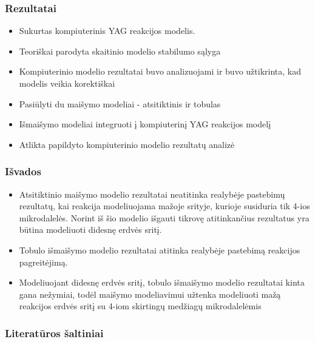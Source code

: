 \documentclass{beamer}
\begin{document}
\begin{frame}
\frametitle{Rezultatai}
\begin{itemize}
    \item Sukurtas kompiuterinis YAG reakcijos modelis. 
    \item Teoriškai parodyta skaitinio modelio stabilumo sąlyga
    \item Kompiuterinio modelio rezultatai buvo analizuojami ir buvo užtikrinta, kad modelis veikia korektiškai
    \item Pasiūlyti du maišymo modeliai - atsitiktinis ir tobulas
    \item Išmaišymo modeliai integruoti į kompiuterinį YAG reakcijos modelį
    \item Atlikta papildyto kompiuterinio modelio rezultatų analizė
\end{itemize}
\end{frame}

\begin{frame}
\frametitle{Išvados}
\begin{itemize}
    \item Atsitiktinio maišymo modelio rezultatai neatitinka realybėje pastebimų rezultatų, kai reakcija modeliuojama mažoje srityje, kurioje susiduria tik 4-ios mikrodalelės. Norint iš šio modelio išgauti tikrovę atitinkančius rezultatus yra būtina modeliuoti didesnę erdvės sritį.

    \item Tobulo išmaišymo modelio rezultatai atitinka realybėje pastebimą reakcijos pagreitėjimą.
    
    \item Modeliuojant didesnę erdvės sritį, tobulo išmaišymo modelio rezultatai kinta gana nežymiai, todėl maišymo modeliavimui užtenka modeliuoti mažą reakcijos erdvės sritį su 4-iom skirtingų medžiagų mikrodalelėmis

\end{itemize}
\end{frame}

\begin{frame}
\frametitle{Literatūros šaltiniai}
\printbibliography
\end{frame}
\end{document}
